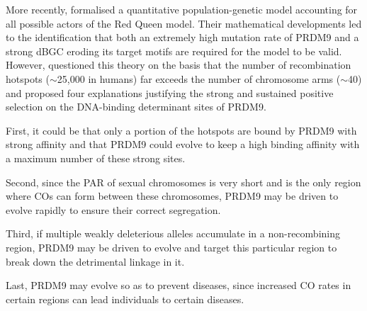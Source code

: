 
More recently, \citet{latrille2017red} formalised a quantitative population-genetic model accounting for all possible actors of the Red Queen model.
Their mathematical developments led to the identification that both an extremely high mutation rate of PRDM9 and a strong dBGC eroding its target motifs are required for the model to be valid.\\



However, \citet{ponting2011what} questioned this theory on the basis that the number of recombination hotspots ($\sim$25,000 in humans) far exceeds the number of chromosome arms ($\sim$40) and proposed four explanations justifying the strong and sustained positive selection on the DNA-binding determinant sites of PRDM9.

First, it could be that only a portion of the hotspots are bound by PRDM9 with strong affinity and that PRDM9 could evolve to keep a high binding affinity with a maximum number of these strong sites.

Second, since the PAR of sexual chromosomes is very short and is the only region where COs can form between these chromosomes, PRDM9 may be driven to evolve rapidly to ensure their correct segregation.

Third, if multiple weakly deleterious alleles accumulate in a non-recombining region, PRDM9 may be driven to evolve and target this particular region to break down the detrimental linkage in it.

Last, PRDM9 may evolve so as to prevent diseases, since increased CO rates in certain regions can lead individuals to certain diseases.


